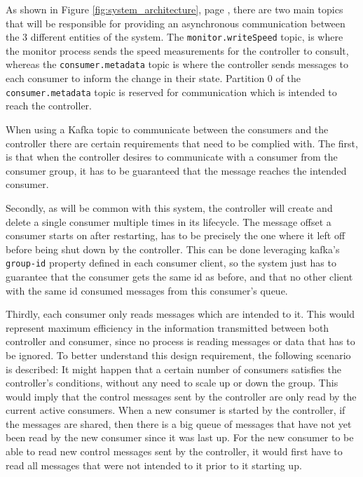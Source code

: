 \begin{sloppypar}
As shown in Figure \ref{fig:system_architecture}, page
\pageref{fig:system_architecture}, there are two main topics that will be
responsible for providing an asynchronous communication between the 3 different
entities of the system. The \lstinline{monitor.writeSpeed} topic, is where the
monitor process sends the speed measurements for the controller to consult,
whereas the \lstinline{consumer.metadata} topic is where the controller sends
messages to each consumer to inform the change in their state. Partition 0 of
the \lstinline{consumer.metadata} topic is reserved for communication which is
intended to reach the controller.
\end{sloppypar}
When using a Kafka topic to communicate between the consumers and the controller
there are certain requirements that need to be complied with. The first, is that
when the controller desires to communicate with a consumer from the consumer
group, it has to be guaranteed that the message reaches the intended consumer. 

Secondly, as will be common with this system, the controller will create and
delete a single consumer multiple times in its lifecycle. The message offset a
consumer starts on after restarting, has to be precisely the one where it left
off before being shut down by the controller. This can be done leveraging
kafka's \lstinline{group-id} property defined in each consumer client, so the
system just has to guarantee that the consumer gets the same id as before, and
that no other client with the same id consumed messages from this consumer's
queue.

Thirdly, each consumer only reads messages which are intended to it. This would
represent maximum efficiency in the information transmitted between both
controller and consumer, since no process is reading messages or data that has
to be ignored. To better understand this design requirement, the following
scenario is described: It might happen that a certain number of consumers
satisfies the controller's conditions, without any need to scale up or down the
group. This would imply that the control messages sent by the controller are
only read by the current active consumers. When a new consumer is started by the
controller, if the messages are shared, then there is a big queue of messages
that have not yet been read by the new consumer since it was last up. For the
new consumer to be able to read new control messages sent by the controller, it
would first have to read all messages that were not intended to it prior to it
starting up.

